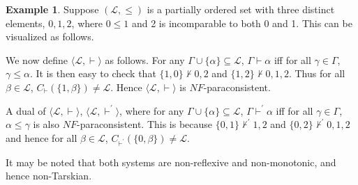 \documentclass[submission]{eptcs}
\newcommand{\lang}{\mathcal{L}}
\theoremstyle{definition}
\newtheorem{exa}[thm]{Example}
\begin{document}
\begin{exa}\label{exm:NF-para2}
Suppose $(\lang,\le)$ is a partially ordered set with three distinct elements, $0,1,2$, where $0\le1$ and 2 is incomparable to both 0 and 1. This can be visualized as follows.
\begin{center}

\end{center}
We now define $\langle\lang,\vdash\rangle$ as follows. For any $\Gamma\cup\{\alpha\}\subseteq\lang$, $\Gamma\vdash\alpha$ iff for all $\gamma\in\Gamma$, $\gamma\le\alpha$. It is then easy to check that $\{1,0\}\not\vdash0,2$ and $\{1,2\}\not\vdash0,1,2$. Thus for all $\beta\in\lang$, $C_\vdash(\{1,\beta\})\neq\lang$. Hence $\langle\lang,\vdash\rangle$ is $NF$-paraconsistent.

A dual of $\langle\lang,\vdash\rangle$, $\langle\lang,\vdash^\prime\rangle$, where for any $\Gamma\cup\{\alpha\}\subseteq\lang$, $\Gamma\vdash^\prime\alpha$ iff for all $\gamma\in\Gamma$, $\alpha\le\gamma$ is also $NF$-paraconsistent. This is because $\{0,1\}\not\vdash^\prime 1,2$ and $\{0,2\}\not\vdash^\prime 0,1,2$ and hence for all $\beta\in\lang$, $C_{\vdash^\prime}(\{0,\beta\})\neq\lang$.

It may be noted that both systems are non-reflexive and non-monotonic, and hence non-Tarskian.
\end{exa}
\end{document}
